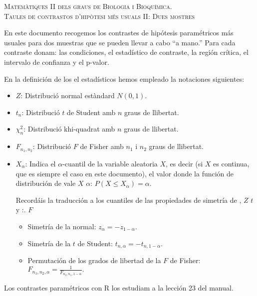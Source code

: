 \documentclass{article}
\begin{document}

\newcommand{\pp}[1]{P(\#1\right)}
\newcommand{\vegeu}[1]{{(\footnotesize vegeu (\#1))}}
\renewcommand{\thecas}{\Roman{cas}}
\newcommand{\posacas}{\addtocounter{cas}{1}{\bf \thecas}}


\begin{center}
\textsc{Matemàtiques II dels graus de Biologia i Bioquímica.\\[0.5ex]  Taules de contrastos d'hipòtesi més usuals II: Dues mostres}
\end{center}
\vspace*{2cm}

\noindent En este documento recogemos los contrastes de hipótesis paramétricos más usuales para dos muestras  que se pueden llevar a cabo ``a mano.'' Para cada contraste donam: las condiciones, el estadístico
de contraste, la región crítica, 
el intervalo de confianza y el p-valor.

En la definición de los el estadísticos hemos empleado la notaciones siguientes:
\begin{itemize}
\item  $Z$: {Distribució normal estàndard $N(0,1)$.} 
\item $t_n$: {Distribució
$t$ de Student amb $n$ graus de llibertat.} 
\item $\chi_n^2$: {Distribució
khi-quadrat amb $n$ graus de llibertat.} 
\item $F_{n_1,n_2}$: {Distribució $F$ de
Fisher  amb $n_1$ i $n_2$ graus de llibertat.}
\item $X_\alpha$: Indica el $\alpha$-cuantil de la variable aleatoria $X$, es decir (si $X$ es continua, que es siempre el caso en este documento), el valor donde la función
de distribución de vale $X$  $\alpha$: $P(X\leq X_\alpha
)=\alpha$. 

Recordáis la traducción a los cuantiles de las propiedades de simetría de , $Z$ $t$ y :. $F$
\begin{itemize}
\item Simetría de la normal: $z_\alpha = -z_{1-\alpha}.$
\item Simetría de la $t$ de Student: $t_{n,\alpha} = -t_{n,1-\alpha}.$
\item Permutación de los grados de libertad de la $F$ de Fisher: $F_{n_1,n_2,\alpha}=\frac{1}{F_{n_2,n_1,1-\alpha}}.$
\end{itemize}
\end{itemize}
Los contrastes paramétricos con R los estudiam a la lección 23 del manual. 
\end{document}
